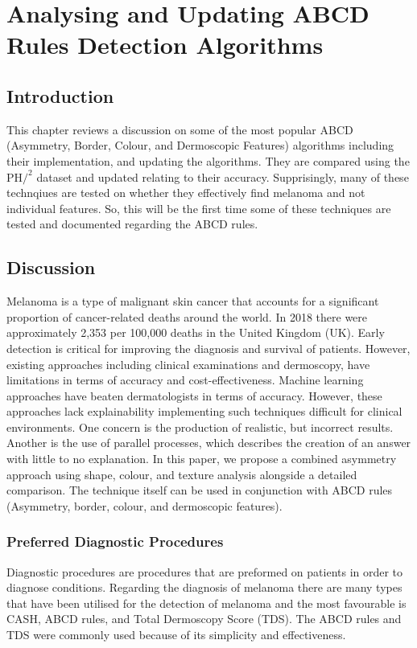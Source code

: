 \chapter{Analysing and Updating ABCD Rules Detection Algorithms}

\section{Introduction}
This chapter reviews a discussion on some of the most popular ABCD (Asymmetry, Border, Colour, and Dermoscopic Features) algorithms including their implementation, and updating the algorithms. They are compared using the PH$/^2$ dataset and updated relating to their accuracy. Supprisingly, many of these technqiues are tested on whether they effectively find melanoma and not individual features. So, this will be the first time some of these techniques are tested and documented regarding the ABCD rules.

\section{Discussion}

Melanoma is a type of malignant skin cancer that accounts for a significant proportion of cancer-related deaths around the world. In 2018 there were approximately 2,353 per 100,000 deaths in the United Kingdom (UK)\cite{UK2019}. Early detection is critical for improving the diagnosis and survival of patients. However, existing approaches including clinical examinations and dermoscopy, have limitations in terms of accuracy and cost-effectiveness\cite{Takiddin2021}. Machine learning approaches have beaten dermatologists in terms of accuracy\cite{Andre2017}. However, these approaches lack explainability implementing such techniques difficult for clinical environments\cite{Fan2017}. One concern is the production of realistic, but incorrect results\cite{Ghorbani2019}. Another is the use of parallel processes, which describes the creation of an answer with little to no explanation. In this paper, we propose a combined asymmetry approach using shape, colour, and texture analysis alongside a detailed comparison. The technique itself can be used in conjunction with ABCD rules (Asymmetry, border, colour, and dermoscopic features).

\subsection{Preferred Diagnostic Procedures}
Diagnostic procedures are procedures that are preformed on patients in order to diagnose conditions. Regarding the diagnosis of melanoma there are many types that have been utilised for the detection of melanoma and the most favourable is CASH, ABCD rules, and Total Dermoscopy Score (TDS). The ABCD rules and TDS were commonly used because of its simplicity and effectiveness.

